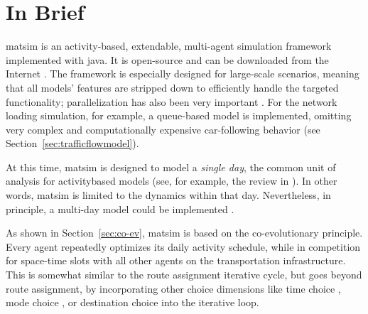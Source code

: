 \section{In Brief}
\label{sec:inbrief}
\gls{matsim} is an activity-based, extendable, multi-agent simulation \gls{framework} 
implemented with 
\gls{java}. It is open-source and can be downloaded from the Internet \citep[][]{MATSIM_Webpage_2015, SourceForge_Webpage_2015}. The \gls{framework} is especially designed for large-scale scenarios, meaning that all models' features are stripped down to efficiently handle the targeted functionality; parallelization has also been very important \citep[e.g.,][]{Dobler_TechRep_IVT_2011, Charypar_PhDThesis_2008}. For the network loading simulation, for example, a queue-based model is implemented, omitting very complex and computationally expensive car-following behavior (see Section~\ref{sec:trafficflowmodel}).

At this time, \gls{matsim} is 
%
designed to model a \emph{single day}, the common unit of analysis for \gls{activitybased} models (see, for example, the review in \citet[][]{Bowman_TEC_2009_1}). In other words, \gls{matsim} is limited to the dynamics within that day. Nevertheless, in principle, a multi-day model could be implemented \citep[][]{ZilskeEtc2012AddingFreightToMatsim,HorniEtAl_TechRep_IVT_2012_a}.

As shown in Section~\ref{sec:co-ev}, \gls{matsim} is based on the co-evolutionary principle. Every agent repeatedly optimizes its daily \gls{activity} schedule, while in  competition for space-time slots with all other agents on the transportation infrastructure.  This is somewhat similar to the route assignment iterative cycle, but goes beyond route assignment, by incorporating other choice dimensions like time choice \citep{BalmerRaneyEtAl2005act-times}, mode choice \citep{GretherEtAl2009SimpleModeChoiceIPL}, or destination choice \citep{HorniEtAl_unpub_TRB_2012} into the iterative loop.

